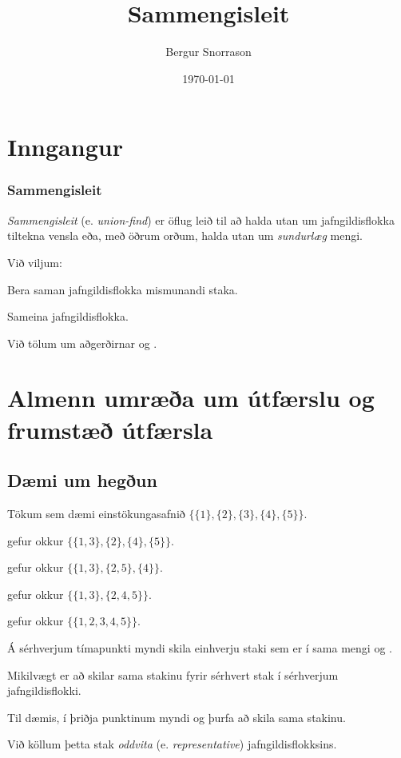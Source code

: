 \title{Sammengisleit}
\author{Bergur Snorrason}
\date{\today}



\frame{\titlepage}

\section{Inngangur}
{
    \frametitle{Sammengisleit}
    {
        \item<1-> \emph{Sammengisleit} (e. \emph{union-find}) er öflug leið til að halda utan um jafngildisflokka tiltekna vensla 
                eða, með öðrum orðum, halda utan um \emph{sundurlæg} mengi.
        \item<2-> Við viljum:
        {
            \item<3-> Bera saman jafngildisflokka mismunandi staka.
            \item<4-> Sameina jafngildisflokka.
        }
        \item<5-> Við tölum um aðgerðirnar  og .
    }
}

\section{Almenn umræða um útfærslu og frumstæð útfærsla}
\subsection{Dæmi um hegðun}
{
    {
        \item<1-> Tökum sem dæmi einstökungasafnið
            $\{\{1\}, \{2\}, \{3\}, \{4\}, \{5\}\}$. 
        \item<2->  gefur okkur
            $\{\{1, 3\}, \{2\}, \{4\}, \{5\}\}$. 
        \item<3->  gefur okkur
            $\{\{1, 3\}, \{2, 5\}, \{4\}\}$. 
        \item<4->  gefur okkur
            $\{\{1, 3\}, \{2, 4, 5\}\}$. 
        \item<5->  gefur okkur
            $\{\{1, 2, 3, 4, 5\}\}$. 
        \item<6-> Á sérhverjum tímapunkti myndi  skila einhverju staki sem er í sama mengi og .
        \item<7-> Mikilvægt er að  skilar sama stakinu fyrir sérhvert stak í sérhverjum jafngildisflokki.
        \item<8-> Til dæmis, í þriðja punktinum myndi  og  þurfa að skila sama stakinu.
        \item<9-> Við köllum þetta stak \emph{oddvita} (e. \emph{representative}) jafngildisflokksins.
    }
}

